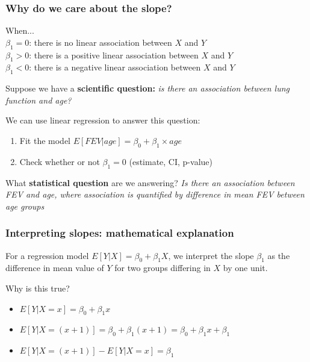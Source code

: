 \documentclass[12pt, 
hyperref={colorlinks=true, linkcolor=blue, urlcolor=cyan}]{beamer}
\begin{document}
\begin{frame}
\frametitle{Why do we care about the slope?}

When... \\
$\beta_1 = 0$: there is no linear association between $X$ and $Y$ \\
$\beta_1 > 0$: there is a positive linear association between $X$ and $Y$ \\
$\beta_1 < 0$: there is a negative linear association between $X$ and $Y$

\pause
Suppose we have a \textbf{scientific question:} \textit{is there an association between lung function and age?}

We can use linear regression to answer this question: \vspace{-0.3cm}
\begin{enumerate}
\item Fit the model $E[FEV|age] = \beta_0 + \beta_1 \times age$
\item Check whether or not $\beta_1 = 0$ \color{blue} (estimate, CI, p-value) \color{black}
\end{enumerate}

\pause
What \textbf{statistical question} are we answering? \textit{Is there an association between FEV and age, where association is quantified by difference in mean FEV between age groups}

\end{frame} 


\begin{frame}
\frametitle{Interpreting slopes: mathematical explanation}

For a regression model $E[Y|X] = \beta_0 + \beta_1 X$, \color{blue} we interpret the slope $\beta_1$ as the difference in mean value of $Y$ for two groups differing in $X$ by one unit. \color{black}

Why is this true?
\begin{itemize}
\item $E[Y|X = x] = \beta_0 + \beta_1 x$ \pause
\item $E[Y|X = (x+1)] = \beta_0 + \beta_1(x+1) = \beta_0 + \beta_1 x + \beta_1$ \pause
\item $E[Y|X = (x+1)] - E[Y|X = x] = \beta_1$
\end{itemize}

\end{frame}
\end{document}
